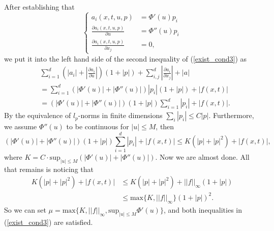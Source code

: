 \documentclass[11pt, a4paper]{article}
\begin{document}
\begin{appendices}
\begin{enumerate}[a)]
	After establishing that
	\begin{equation*}
		\begin{cases}
			a_i(x,t,u,p) &= \Phi'(u)p_i \\
			\frac{\partial a_i(x,t,u,p)}{\partial u} &= \Phi''(u)p_i \\
			\frac{\partial a_i(x,t,u,p)}{\partial x_j} &= 0,
		\end{cases}	
	\end{equation*}
	we put it into the left hand side of the second inequality of (\ref{exist_cond3}) as
	\begin{align*}
	&\sum_{i=1}^d\left( |a_i| + \left| \frac{\partial a_i}{\partial u}\right| \right)(1+|p|) + \sum_{i,j}^d\left| \frac{\partial a_i}{\partial x_j} \right| + |a| \\
	&= \sum_{i=1}^d\left( |\Phi'(u)| + |\Phi''(u)| \right)|p_i|(1+|p|) + |f(x,t)| \\
	&= (|\Phi'(u)| + |\Phi''(u)|)(1+|p|)\sum_{i=1}^d|p_i| + |f(x,t)|.
	\end{align*}
	By the equivalence of $l_p$-norms in finite dimensions $\sum_i |p_i| \leq C|p|$. Furthermore, we assume $\Phi''(u)$ to be continuous for $|u|\leq M$, then
	\begin{equation*}
	(|\Phi'(u)| + |\Phi''(u)|)(1+|p|)\sum_{i=1}^d|p_i| + |f(x,t)| \leq K(|p| + |p|^2) + |f(x,t)|,
	\end{equation*}
	where $K = C\cdot \text{sup}_{|u|\leq M}(|\Phi'(u)| + |\Phi''(u)|)$. Now we are almost done. All that remains is noticing that
	\begin{align*}
	K(|p| + |p|^2) + |f(x,t)| &\leq K(|p| + |p|^2) + ||f||_{\infty}(1+|p|) \\
	&\leq \text{max}\{ K, ||f||_\infty \} (1+|p|)^2.
	\end{align*}
	So we can set $\mu = \text{max}\{K, ||f||_\infty, \text{sup}_{|u|\leq M}\Phi'(u) \}$, and both inequalities in (\ref{exist_cond3}) are satisfied.
	

\end{enumerate}
\end{appendices}
\end{document}
